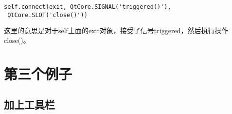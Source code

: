 \documentclass[12pt,oneside]{book}
\begin{document}
\begin{common-format}
\begin{Verbatim}
self.connect(exit, QtCore.SIGNAL('triggered()'),
 QtCore.SLOT('close()'))
\end{Verbatim}

这里的意思是对于self上面的exit对象，接受了信号triggered，然后执行操作close()。




\chapter{第三个例子}
\section{加上工具栏}




\end{common-format}
\end{document}
